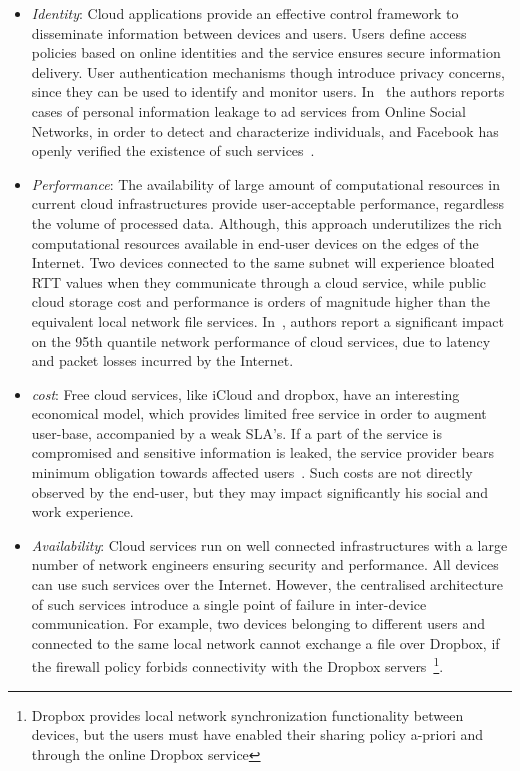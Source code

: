 \begin{itemize}
  \item{\it Identity}\/: Cloud applications provide an effective control
       framework to disseminate information between devices and users.  Users
       define access policies based on online identities and the service ensures
       secure information delivery.  User authentication mechanisms though
       introduce privacy concerns, since they can be used to identify and
       monitor users.  In~\cite{Krishnamurthy2009} the authors reports cases of
       personal information leakage to ad services from Online Social Networks,
       in order to detect and characterize individuals, and Facebook has openly
       verified the existence of such services~\cite{beacon-facebook}. 

\item {\it Performance}\/: The availability of large amount of computational
      resources in current cloud infrastructures provide user-acceptable
      performance, regardless the volume of processed data.  Although, this approach
      underutilizes the rich computational resources available in
      end-user devices on the edges of the Internet.  Two devices connected to
      the same subnet will experience bloated RTT values when they communicate
      through a cloud service, while public cloud storage cost and performance
      is orders of magnitude higher than the equivalent local network file services.
      In~\cite{Wittie2010}, authors report a significant impact on the 95th
      quantile network performance of cloud services, due to latency and packet
      losses incurred by the Internet.

\item {\it cost}\/: Free cloud services, like iCloud and dropbox, 
  have an interesting economical model, which provides limited free service in
  order to augment user-base, accompanied by a weak SLA's.  If a part of the
  service is compromised and sensitive information is leaked, the service
  provider bears minimum obligation towards affected users~\cite{cnet-dropbox}.
  Such costs are not directly observed by the end-user, but they may impact
  significantly his social and work experience. 

\item {\it Availability}\/: Cloud services run on well connected infrastructures
      with a large number of network engineers ensuring security and
      performance. All devices can use such services over the Internet. However,
      the centralised architecture of such services introduce a single point of
      failure in inter-device communication. For example, two devices belonging
      to different users and connected to the same local network cannot exchange
      a file over Dropbox, if the firewall policy forbids connectivity with the
      Dropbox servers~\footnote{Dropbox provides local network synchronization
        functionality between devices, but the users must have enabled their
        sharing policy a-priori and through the online Dropbox service}. 


\end{itemize}
